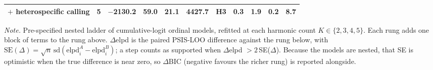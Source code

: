 \begin{table}[htbp]
\begin{tabular}{@{}l r rr r r rrr r c@{}}
\hspace{0.5em}$+$ heterospecific calling & 5 & $-$2130.2 & 59.0 & 21.1 & 4427.7 & H3 & 0.3 & 1.9 & 0.2 & 8.7 \\
\bottomrule
\end{tabular}
\par\vspace{3pt}
\begin{minipage}{\linewidth}\footnotesize\raggedright
\textit{Note.} Pre-specified nested ladder of cumulative-logit ordinal models, refitted at each harmonic count $K \in \{2, 3, 4, 5\}$. Each rung adds one block of terms to the rung above. $\Delta$elpd is the paired PSIS-LOO difference against the rung below, with $\mathrm{SE}(\Delta)=\sqrt{n}\,\mathrm{sd}(\mathrm{elpd}_i^{A}-\mathrm{elpd}_i^{B})$; a step counts as supported when $\Delta$elpd $>2\,$SE($\Delta$). Because the models are nested, that SE is optimistic when the true difference is near zero, so $\Delta$BIC (negative favours the richer rung) is reported alongside.
\end{minipage}
\end{table}